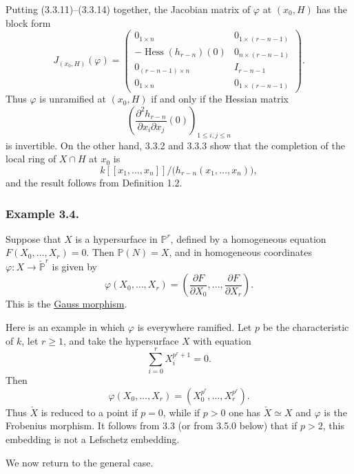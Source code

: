 Putting (3.3.11)--(3.3.14) together, the Jacobian matrix of
$\varphi$ at $(x_0,H)$ has the block form
\begin{equation}\tag{3.3.15}
J_{(x_0,H)}(\varphi)=
\left(
\begin{array}{c|c}
0_{1\times n} & 0_{1\times(r-n-1)}\\ \hline
-\operatorname{Hess}(h_{r-n})(0) & 0_{n\times(r-n-1)}\\ \hline
0_{(r-n-1)\times n} & I_{r-n-1}\\ \hline
0_{1\times n} & 0_{1\times(r-n-1)}
\end{array}
\right).
\end{equation}
Thus $\varphi$ is unramified at $(x_0,H)$ if and only if the Hessian
matrix
\[
\left(
\frac{\partial^2h_{r-n}}{\partial x_i\partial x_j}(0)
\right)_{1\leq i,j\leq n}
\]
is invertible.  On the other hand, 3.3.2 and 3.3.3 show that the
completion of the local ring of $X\cap H$ at $x_0$ is
\begin{equation}\tag{3.3.16}
k[[x_1,\ldots,x_n]]/
\bigl(h_{r-n}(x_1,\ldots,x_n)\bigr),
\end{equation}
and the result follows from Definition 1.2.

\subsubsection*{Example 3.4.}
Suppose that $X$ is a hypersurface in $\mathbb P^r$, defined by a
homogeneous equation $F(X_0,\ldots,X_r)=0$.  Then
$\mathbb P(N)=X$, and in homogeneous coordinates
$\varphi:X\to\check{\mathbb P}^{r}$ is given by
\begin{equation}\tag{3.4.1}
\varphi(X_0,\ldots,X_r)=
\left(
\frac{\partial F}{\partial X_0},\ldots,
\frac{\partial F}{\partial X_r}
\right).
\end{equation}
This is the \underline{Gauss morphism}.

Here is an example in which $\varphi$ is everywhere ramified.  Let
$p$ be the characteristic of $k$, let $r\geq1$, and take the
hypersurface $X$ with equation
\begin{equation}\tag{3.4.2}
\sum_{i=0}^{r}X_i^{p^r+1}=0.
\end{equation}
Then
\begin{equation}\tag{3.4.3}
\varphi(X_0,\ldots,X_r)
=(X_0^{p^r},\ldots,X_r^{p^r}).
\end{equation}
Thus $\check X$ is reduced to a point if $p=0$, while if $p>0$ one
has $\check X\simeq X$ and $\varphi$ is the Frobenius morphism.  It
follows from 3.3 (or from 3.5.0 below) that if $p>2$, this embedding is
not a Lefschetz embedding.

We now return to the general case.
